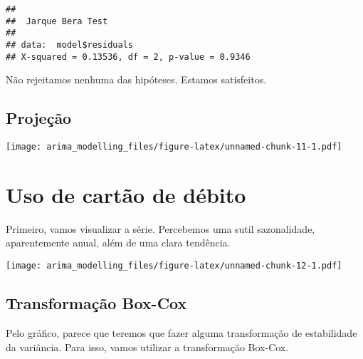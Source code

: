 \documentclass[]{article}
\newenvironment{Shaded}{\begin{snugshade}}{\end{snugshade}}
\newcommand{\DataTypeTok}[1]{\textcolor[rgb]{0.13,0.29,0.53}{#1}}
\newcommand{\DecValTok}[1]{\textcolor[rgb]{0.00,0.00,0.81}{#1}}
\newcommand{\KeywordTok}[1]{\textcolor[rgb]{0.13,0.29,0.53}{\textbf{#1}}}
\newcommand{\NormalTok}[1]{#1}
\newcommand{\OperatorTok}[1]{\textcolor[rgb]{0.81,0.36,0.00}{\textbf{#1}}}
\newcommand{\StringTok}[1]{\textcolor[rgb]{0.31,0.60,0.02}{#1}}
\begin{document}
\begin{Shaded}
\end{Shaded}

\begin{verbatim}
## 
##  Jarque Bera Test
## 
## data:  model$residuals
## X-squared = 0.13536, df = 2, p-value = 0.9346
\end{verbatim}

Não rejeitamos nenhuma das hipóteses. Estamos satisfeitos.

\hypertarget{projeuxe7uxe3o}{%
\subsection{Projeção}\label{projeuxe7uxe3o}}

\begin{Shaded}
\end{Shaded}

\texttt{[image: arima\_modelling\_files/figure-latex/unnamed-chunk-11-1.pdf]}

\hypertarget{uso-de-cartuxe3o-de-duxe9bito}{%
\section{Uso de cartão de débito}\label{uso-de-cartuxe3o-de-duxe9bito}}

Primeiro, vamos visualizar a série. Percebemos uma sutil sazonalidade,
aparentemente anual, além de uma clara tendência.

\texttt{[image: arima\_modelling\_files/figure-latex/unnamed-chunk-12-1.pdf]}

\hypertarget{transformauxe7uxe3o-box-cox-1}{%
\subsection{Transformação Box-Cox}\label{transformauxe7uxe3o-box-cox-1}}

Pelo gráfico, parece que teremos que fazer alguma transformação de
estabilidade da variância. Para isso, vamos utilizar a transformação
Box-Cox.
\end{document}
